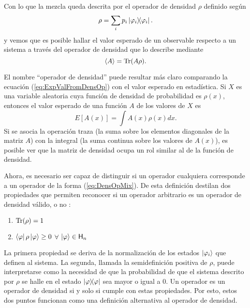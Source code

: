 Con lo que la mezcla queda descrita por el operador de densidad $\rho$ definido según
\begin{equation}\label{eq:DensOpMix}
\rho=\sum_{i}p_{i}\dyad{\varphi_{i}}.
\end{equation}
y vemos que es posible hallar el valor esperado de un observable respecto a un sistema a través del operador de densidad que lo describe mediante
\begin{equation}\label{eq:ExpValFromDensOp}
\expval{A}=\Tr(A\rho).
\end{equation}

El nombre ``operador de densidad'' puede resultar más claro comparando la ecuación (\ref{eq:ExpValFromDensOp}) con el valor esperado en estadística. Si $X$ es una variable aleatoria cuya función de densidad de probabilidad es $\rho(x)$, entonces el valor esperado de una función $A$ de los valores de $X$ es
\begin{equation*}
E[A(x)]=\int A(x) \rho(x) dx.
\end{equation*}
Si se asocia la operación traza (la suma sobre los elementos diagonales de la matriz $A$) con la integral (la suma continua sobre los valores de $A(x)$), es posible ver que la matriz de densidad ocupa un rol similar al de la función de densidad.

Ahora, es necesario ser capaz de distinguir si un operador cualquiera corresponde a un operador de la forma (\ref{eq:DensOpMix}). De esta definición destilan dos propiedades que permiten reconocer si un operador arbitrario es un operador de densidad válido, o no \cite{Holevo}:
\begin{enumerate}
    \item $\Tr(\rho)=1$
    \item $\bra{\varphi}\rho\ket{\varphi}\geq 0$ $\forall$ $\ket{\varphi}\in{\sf H}_{n}$
\end{enumerate}
La primera propiedad se deriva de la normalización de los estados $\ket{\varphi_{i}}$ que definen al sistema.  La segunda, llamada la semidefinición positiva de $\rho$, puede interpretarse como la necesidad de que la probabilidad de que el sistema descrito por $\rho$ se halle en el estado $\dyad{\varphi}$ sea mayor o igual a $0$. Un operador es un operador de densidad si y solo si cumple con estas propiedades. Por esto, estos dos puntos funcionan como una definición alternativa al operador de densidad.

